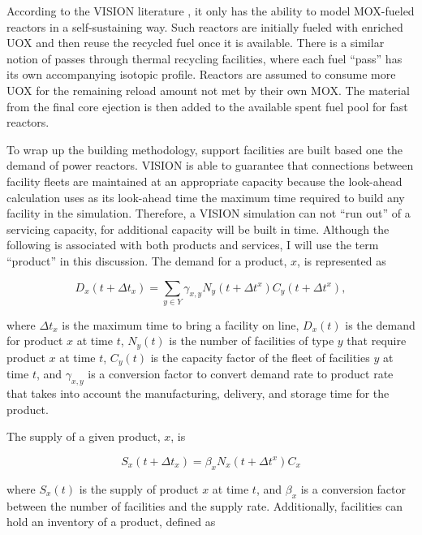 According to the VISION literature \cite{schweitzer_improved_2008}, it only has
the ability to model MOX-fueled reactors in a self-sustaining way. Such reactors
are initially fueled with enriched UOX and then reuse the recycled fuel once it
is available. There is a similar notion of passes through thermal recycling
facilities, where each fuel ``pass'' has its own accompanying isotopic
profile. Reactors are assumed to consume more UOX for the remaining reload
amount not met by their own MOX. The material from the final core ejection is
then added to the available spent fuel pool for fast reactors.

To wrap up the building methodology, support facilities are built based one the
demand of power reactors. VISION is able to guarantee that connections between
facility fleets are maintained at an appropriate capacity because the look-ahead
calculation uses as its look-ahead time the maximum time required to build any
facility in the simulation. Therefore, a VISION simulation can not ``run out''
of a servicing capacity, for additional capacity will be built in time. Although
the following is associated with both products and services, I will use the term
``product'' in this discussion. The demand for a product, $x$, is
represented as

\begin{equation}
D_x(t + \Delta t_x) = \sum_{y \in Y} \gamma_{x,y} N_y(t + \Delta t^x) C_y(t + \Delta t^x),
\end{equation}

where $\Delta t_x$ is the maximum time to bring a facility on line, $D_x(t)$ is
the demand for product $x$ at time $t$, $N_y(t)$ is the number of
facilities of type $y$ that require product $x$ at time $t$, $C_y(t)$ is
the capacity factor of the fleet of facilities $y$ at time $t$, and
$\gamma_{x,y}$ is a conversion factor to convert demand rate to product
rate that takes into account the manufacturing, delivery, and storage time for
the product.

The supply of a given product, $x$, is

\begin{equation}
S_x(t + \Delta t_x) = \beta_x N_x(t + \Delta t^x) C_x
\end{equation}

where $S_x(t)$ is the supply of product $x$ at time $t$, and $\beta_x$ is a
conversion factor between the number of facilities and the supply
rate. Additionally, facilities can hold an inventory of a product, defined as

